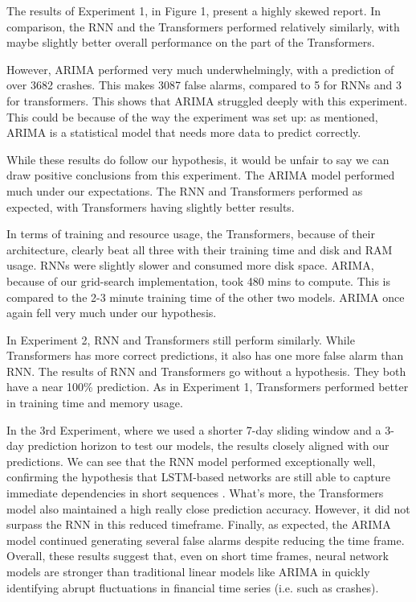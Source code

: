 \documentclass[12pt, letterpaper]{article}
\begin{document}
The results of Experiment 1, in Figure 1, present a highly skewed report. In comparison, the RNN and the Transformers performed relatively similarly, with maybe slightly better overall performance on the part of the Transformers.

However, ARIMA performed very much underwhelmingly, with a prediction of over 3682 crashes. This makes 3087 false alarms, compared to 5 for RNNs and 3 for transformers. This shows that ARIMA struggled deeply with this experiment. This could be because of the way the experiment was set up: as mentioned, ARIMA is a statistical model that needs more data to predict correctly.

While these results do follow our hypothesis, it would be unfair to say we can draw positive conclusions from this experiment. The ARIMA model performed much under our expectations. The RNN and Transformers performed as expected, with Transformers having slightly better results.

In terms of training and resource usage, the Transformers, because of their architecture, clearly beat all three with their training time and disk and RAM usage. RNNs were slightly slower and consumed more disk space. ARIMA, because of our grid-search implementation, took 480 mins to compute. This is compared to the 2-3 minute training time of the other two models. ARIMA once again fell very much under our hypothesis.

In Experiment 2, RNN and Transformers still perform similarly. While Transformers has more correct predictions, it also has one more false alarm than RNN. The results of RNN and Transformers go without a hypothesis. They both have a near 100\% prediction. As in Experiment 1, Transformers performed better in training time and memory usage.

In the 3rd Experiment, where we used a shorter 7-day sliding window and a 3-day prediction horizon to test our models, the results closely aligned with our predictions. We can see that the RNN model performed exceptionally well, confirming the hypothesis that LSTM-based networks are still able to capture immediate dependencies in short sequences \cite{Hansika}. What's more, the Transformers model also maintained a high really close prediction accuracy. However, it did not surpass the RNN in this reduced timeframe. Finally, as expected, the ARIMA model continued generating several false alarms despite reducing the time frame. Overall, these results suggest that, even on short time frames,  neural network models are stronger than traditional linear models like ARIMA in quickly identifying abrupt fluctuations in financial time series (i.e. such as crashes).
\end{document}

